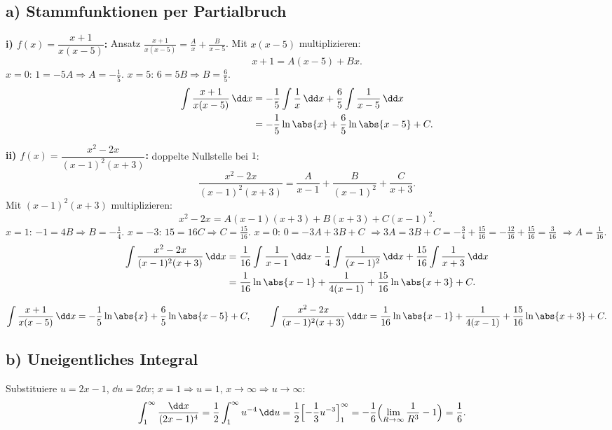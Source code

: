 
\subsection*{a) Stammfunktionen per Partialbruch}

\textbf{i) $f(x)=\dfrac{x+1}{x(x-5)}$:} Ansatz
$\frac{x+1}{x(x-5)}=\frac{A}{x}+\frac{B}{x-5}$. Mit $x(x-5)$ multiplizieren:
\begin{equation}
  x+1 = A(x-5)+Bx .
\end{equation}
$x=0$: $1=-5A\Rightarrow A=-\frac15$. $x=5$: $6=5B\Rightarrow B=\frac65$.
\begin{align}
  \int \frac{x+1}{x(x-5)}\,\dd x
  &= -\frac15\int\frac1x\,\dd x + \frac65\int\frac{1}{x-5}\,\dd x \\
  &= -\frac15\ln\abs{x} + \frac65\ln\abs{x-5} + C .
\end{align}

\textbf{ii) $f(x)=\dfrac{x^2-2x}{(x-1)^2(x+3)}$:} doppelte Nullstelle bei $1$:
\begin{equation}
  \frac{x^2-2x}{(x-1)^2(x+3)}
  = \frac{A}{x-1} + \frac{B}{(x-1)^2} + \frac{C}{x+3}.
\end{equation}
Mit $(x-1)^2(x+3)$ multiplizieren:
\begin{equation}
  x^2-2x = A(x-1)(x+3) + B(x+3) + C(x-1)^2 .
\end{equation}
$x=1$: $-1 = 4B \Rightarrow B=-\frac14$. $x=-3$: $15=16C\Rightarrow
C=\frac{15}{16}$. $x=0$: $0=-3A+3B+C$
$\Rightarrow 3A=3B+C=-\frac34+\frac{15}{16}=-\frac{12}{16}+\frac{15}{16}=\frac{3}{16}$
$\Rightarrow A=\frac{1}{16}$.
\begin{align}
  \int \frac{x^2-2x}{(x-1)^2(x+3)}\,\dd x
  &= \frac1{16}\int\frac1{x-1}\,\dd x
   - \frac14\int\frac1{(x-1)^2}\,\dd x
   + \frac{15}{16}\int\frac1{x+3}\,\dd x \\
  &= \frac1{16}\ln\abs{x-1}
   + \frac{1}{4(x-1)}
   + \frac{15}{16}\ln\abs{x+3} + C .
\end{align}

\begin{ergebnis}
\[
\int\frac{x+1}{x(x-5)}\,\dd x=-\frac15\ln\abs{x}+\frac65\ln\abs{x-5}+C,
\qquad
\int\frac{x^2-2x}{(x-1)^2(x+3)}\,\dd x
=\frac1{16}\ln\abs{x-1}+\frac{1}{4(x-1)}+\frac{15}{16}\ln\abs{x+3}+C.
\]
\end{ergebnis}

\subsection*{b) Uneigentliches Integral}
Substituiere $u=2x-1$, $\dd u=2\dd x$; $x=1\Rightarrow u=1$,
$x\to\infty\Rightarrow u\to\infty$:
\begin{align}
  \int_1^\infty \frac{\dd x}{(2x-1)^4}
  &= \frac12\int_1^\infty u^{-4}\,\dd u
   = \frac12\Bigl[-\frac13 u^{-3}\Bigr]_1^\infty
   = -\frac16\Bigl(\lim_{R\to\infty}\frac1{R^3}-1\Bigr)
   = \frac16 .
\end{align}

